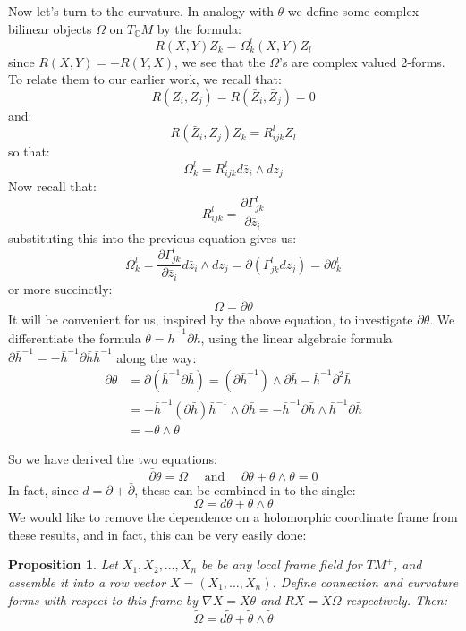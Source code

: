 \documentclass[11pt]{amsart}
\newtheorem{prop}[subsection]{Proposition}
\theoremstyle{definition}
\def \C{ \mathbb{C} }
\def \del{ \partial }
\def \delbar{ \bar{\partial} }
\def \thetasquig{ \tilde{\theta} }
\def \Omegasquig{ \tilde{\Omega} }
\begin{document}
Now let's turn to the curvature.  In analogy with $\theta$ we define some complex bilinear objects $\Omega$ on $T_{\C}M$ by the formula:
%
$$ R( X, Y ) Z_k = \Omega_k^l (X, Y) Z_l $$
%
since $R(X,Y) = - R(Y,X)$, we see that the $\Omega$'s are complex valued 2-forms.  To relate them to our earlier work, we recall that:
%
$$ R(Z_i, Z_j) = R( \bar{Z}_i, \bar{Z}_j ) = 0 $$
%
and:
%
$$ R( \bar{Z}_i, Z_j )Z_k = R_{ijk}^l Z_l $$
%
so that:
%
$$ \Omega_k^l = R_{ijk}^l d \bar{z}_i \wedge d z_j $$
%
Now recall that:
%
$$ R_{ijk}^l = \frac{ \del \Gamma_{jk}^l }{ \del \bar{z}_i } $$
%
substituting this into the previous equation gives us:
%
$$ \Omega_k^l = \frac{ \del \Gamma_{jk}^l }{ \del \bar{z}_i } d \bar{z}_i \wedge d z_j = \delbar( \Gamma_{jk}^l d z_j ) = \delbar \theta_k^l $$
%
or more succinctly:
%
$$ \Omega = \delbar \theta $$
%
It will be convenient for us, inspired by the above equation, to investigate $ \del \theta $.  We differentiate the formula $\theta = \bar{h}^{-1} \del \bar{h}$, using the linear algebraic formula $\del \bar{h}^{-1} = - \bar{h}^{-1} \del \bar{h} \bar{h}^{-1}$ along the way:
%
\begin{align*}
\del \theta &= \del(  \bar{h}^{-1} \del \bar{h} ) = ( \del \bar{h}^{-1} ) \wedge \del \bar{h} - \bar{h}^{-1} \del^2 \bar{h} \\
&= - \bar{h}^{-1} (\del \bar{h}) \bar{h}^{-1} \wedge \del \bar{h}  = - \bar{h}^{-1} \del \bar{h} \wedge \bar{h}^{-1} \del \bar{h} \\
&= - \theta \wedge \theta
\end{align*}

So we have derived the two equations:
%
$$ \delbar \theta = \Omega \quad \text{ and } \quad \del \theta + \theta \wedge \theta = 0 $$
%
In fact, since $d = \del + \delbar$, these can be combined in to the single:
%
$$ \Omega = d \theta + \theta \wedge \theta $$
%
We would like to remove the dependence on a holomorphic coordinate frame from these results, and in fact, this can be very easily done:
%
\begin{prop} Let $X_1, X_2, \ldots, X_n$ be be any local frame field for $TM^{+}$, and assemble it into a row vector $X = (X_1, \ldots, X_n)$. Define connection and curvature forms with respect to this frame by $ \nabla X = X \thetasquig $ and $ R X = X \Omegasquig $ respectively.  Then:
%
$$ \Omegasquig = d \thetasquig + \thetasquig \wedge \thetasquig $$
%
\end{prop}
\end{document}
